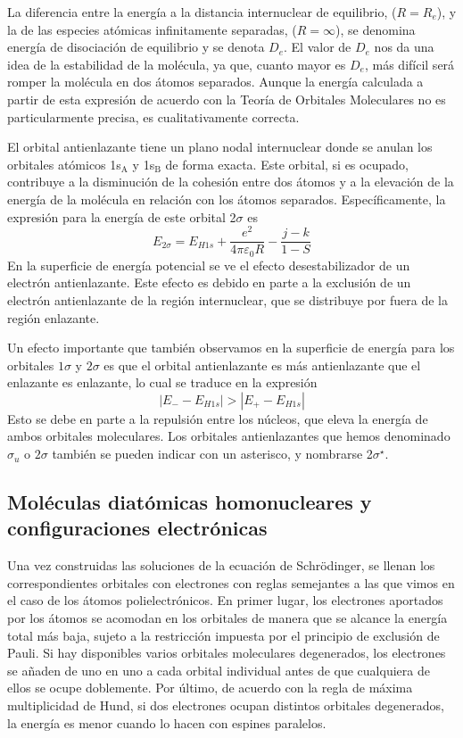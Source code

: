\documentclass{tufte-handout}
\begin{document}
La diferencia entre la energía a la distancia internuclear de equilibrio, ($R = R_e$), y la de las especies atómicas infinitamente separadas, ($R=\infty$), se denomina energía de disociación de equilibrio y se denota $D_e$. 
El valor de $D_e$ nos da una idea de la estabilidad de la molécula,  ya que, cuanto mayor es $D_e$, más difícil será romper la molécula en dos átomos separados. 
Aunque la energía calculada a partir de esta expresión de acuerdo con la Teoría de Orbitales Moleculares no  es particularmente precisa, es cualitativamente correcta.

El orbital antienlazante tiene un plano nodal internuclear donde se anulan los orbitales atómicos 1s$_\mathrm{A}$ y 1s$_\mathrm{B}$ de forma exacta. 
Este orbital, si es ocupado, contribuye a la disminución de la cohesión entre dos átomos y a la elevación de la energía de la molécula en relación con los átomos separados. 
Específicamente, la expresión para la energía de este orbital 2$\sigma$ es
\begin{equation}
    E_{2\sigma}=E_{H1s} + \frac{e^2}{4\pi\varepsilon_0R}
    -\frac{j-k}{1-S}\label{eq:ener_2sigma}
\end{equation}
En la superficie de energía potencial se ve el efecto desestabilizador de un electrón antienlazante. 
Este efecto es debido en parte a la exclusión de un electrón  antienlazante de la región internuclear, que se distribuye por fuera de la región enlazante. 

Un efecto importante que también observamos en la superficie de energía para los orbitales $1\sigma$ y $2\sigma$ es que el orbital antienlazante es más antienlazante que el enlazante es enlazante, lo cual se traduce en la expresión
\begin{equation}
    |E_{-}-E_{H1s}|>|E_+-E_{H1s}|
\end{equation}
Esto se debe en parte a la repulsión entre los núcleos, que eleva la energía de ambos orbitales moleculares. 
Los orbitales antienlazantes que hemos denominado $\sigma_u$ o $2\sigma$ también se pueden indicar con un asterisco, y nombrarse 2$\sigma^\star$.

\subsection{Moléculas diatómicas homonucleares y configuraciones electrónicas}
Una vez construidas las soluciones de la ecuación de Schrödinger, se llenan los correspondientes orbitales con electrones con reglas semejantes a las que vimos en el caso de los átomos polielectrónicos.
En primer lugar, los electrones aportados por los átomos se acomodan en los orbitales de manera que se alcance la energía total más baja, sujeto a la restricción impuesta por el principio de exclusión de Pauli.
Si hay disponibles varios orbitales moleculares degenerados, los electrones se añaden de uno en uno a cada orbital individual antes de que cualquiera de ellos se ocupe doblemente.
Por último, de acuerdo con la regla de máxima multiplicidad de Hund, si dos electrones ocupan distintos orbitales degenerados, la energía es menor cuando lo hacen con espines paralelos.
\end{document}
